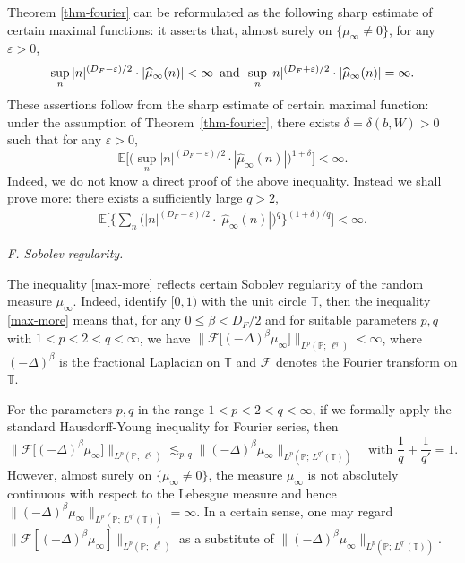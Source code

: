 \documentclass[12pt]{amsart}
\theoremstyle{definition}
\theoremstyle{remark}
\newcommand{\E}{\mathbb{E}}
\newcommand{\T}{\mathbb{T}}
\newcommand{\PP}{\mathbb{P}}
\newcommand{\an}{\text{\, and \,}}
\numberwithin{equation}{section}
\begin{document}
 Theorem \ref{thm-fourier} can be reformulated as the following sharp  estimate of certain  maximal functions: it asserts that, almost surely on $\{\mu_\infty\ne 0\}$,  for any $\varepsilon >0$,  
\[
\sup_{n} |n|^{(D_F-\varepsilon)/2}  \cdot   |\widehat{\mu}_\infty(n)|<\infty \an 
 \sup_{n} |n|^{(D_F+\varepsilon)/2}  \cdot   |\widehat{\mu}_\infty(n)| = \infty. 
\]
These assertions follow from  the sharp estimate of certain  maximal function: under the assumption of Theorem~\ref{thm-fourier},   there exists $\delta= \delta(b, W)> 0$ such that 
for any $\varepsilon >0$, 
\[
\E\Big[\Big(\sup_{n} |n|^{(D_F-\varepsilon)/2}  \cdot   |\widehat{\mu}_\infty(n)|\Big)^{1+ \delta}\Big] <\infty. 
\]
Indeed, we do not know a direct proof of the above inequality.   Instead we shall prove more: there exists a sufficiently large $q>2$, 
\begin{align}\label{max-more}
\E\Big[\Big\{ \sum_{n}  \Big( |n|^{(D_F-\varepsilon)/2}  \cdot   |\widehat{\mu}_\infty(n)|\Big)^q\Big\}^{(1+ \delta)/q}\Big] <\infty. 
\end{align}



{\flushleft \it F.  Sobolev regularity.}



The inequality \eqref{max-more}  reflects certain Sobolev regularity  of the random measure $\mu_\infty$.  Indeed,  identify  $[0,1)$ with the unit circle $\T$, then the inequality \eqref{max-more} means that,  for any $0\le \beta< D_F/2$ and for suitable  parameters $p, q$ with $1< p< 2< q<\infty$,  we have 
$
 \big\| \mathcal{F}\big[ (-\Delta)^{\beta} \mu_\infty \big] \big\|_{L^p(\PP; \, \ell^q)}<\infty$, 
where $(-\Delta)^{\beta}$ is the fractional Laplacian on  $\T$ and $\mathcal{F}$ denotes the Fourier transform on $\T$. 

 For the parameters $p,q$ in the range $1<p<2<q<\infty$,  if we formally apply the standard Hausdorff-Young inequality for Fourier series, then 
\[
 \big\| \mathcal{F}\big[ (-\Delta)^{\beta} \mu_\infty \big] \big\|_{L^p(\PP; \, \ell^q)} \lesssim_{p,q}    \big\| (-\Delta)^{\beta} \mu_\infty \big\|_{L^p(\PP; \, L^{q'} (\T))} \quad \text{with $\frac{1}{q} + \frac{1}{q'} = 1$}.
\]
However, almost surely on $\{\mu_\infty \ne 0\}$,  the measure $\mu_\infty$ is  not absolutely continuous with respect to the Lebesgue measure  and hence
$
\| (-\Delta)^{\beta} \mu_\infty \|_{L^p(\PP; \, L^{q'} (\T))} = \infty.
$
In a certain sense,  one may regard $\| \mathcal{F} [ (-\Delta)^{\beta} \mu_\infty  ] \|_{L^p(\PP; \, \ell^q)} $ as  a substitute of  $ \| (-\Delta)^{\beta} \mu_\infty \|_{L^p(\PP; \, L^{q'} (\T))}$. 
\end{document}
